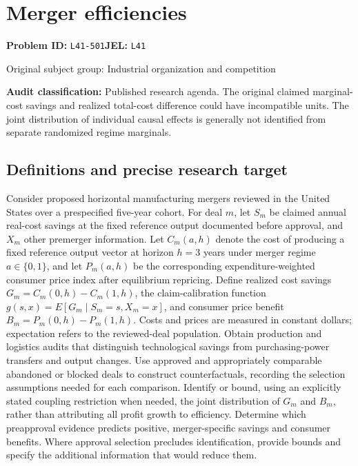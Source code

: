 \documentclass[11pt,a4paper]{article}
\begin{document}
\section*{Merger efficiencies}
\textbf{Problem ID:} \texttt{L41-501}\quad \textbf{JEL:} \texttt{L41}\par
\label{problem:OP-0394}
{\sffamily\small\color{muted}Original subject group: Industrial organization and competition\par}
\label{definitions:problem:30007676}
\textbf{Audit classification:} Published research agenda. The original claimed marginal-cost savings and realized total-cost difference could have incompatible units. The joint distribution of individual causal effects is generally not identified from separate randomized regime marginals.
\subsection*{Definitions and precise research target}
Consider proposed horizontal manufacturing mergers reviewed in the United States over a prespecified five-year cohort. For deal \(m\), let \(S_m\) be claimed annual real-cost savings at the fixed reference output documented before approval, and \(X_m\) other premerger information. Let \(C_m(a,h)\) denote the cost of producing a fixed reference output vector at horizon \(h=3\) years under merger regime \(a\in\{0,1\}\), and let \(P_m(a,h)\) be the corresponding expenditure-weighted consumer price index after equilibrium repricing. Define realized cost savings \(G_m=C_m(0,h)-C_m(1,h)\), the claim-calibration function \(g(s,x)=E[G_m\mid S_m=s,X_m=x]\), and consumer price benefit \(B_m=P_m(0,h)-P_m(1,h)\). Costs and prices are measured in constant dollars; expectation refers to the reviewed-deal population. Obtain production and logistics audits that distinguish technological savings from purchasing-power transfers and output changes. Use approved and appropriately comparable abandoned or blocked deals to construct counterfactuals, recording the selection assumptions needed for each comparison. Identify or bound, using an explicitly stated coupling restriction when needed, the joint distribution of \(G_m\) and \(B_m\), rather than attributing all profit growth to efficiency. Determine which preapproval evidence predicts positive, merger-specific savings and consumer benefits. Where approval selection precludes identification, provide bounds and specify the additional information that would reduce them.
\end{document}
